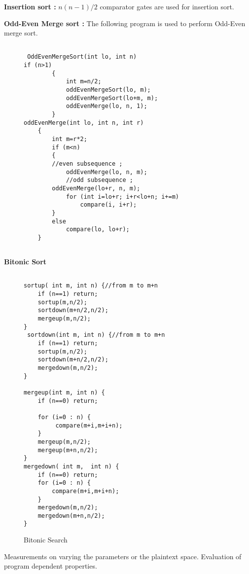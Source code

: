 \documentclass{acm_proc_article-sp}
\begin{document}
\textbf{Insertion sort :} $n(n-1)/2$ comparator gates are used for insertion sort.

\textbf{Odd-Even Merge sort :} The following program is used to perform Odd-Even merge sort.

\lstset{                                    %
  language=C,
  frame=lines,
  captionpos=b
 }


\renewcommand{\lstlistingname}{Code}


\begin{figure}
\begin{lstlisting}[caption=Odd-Even Merge Sort]

 OddEvenMergeSort(int lo, int n)
if (n>1)
        {
            int m=n/2;
            oddEvenMergeSort(lo, m);
            oddEvenMergeSort(lo+m, m);
            oddEvenMerge(lo, n, 1);
        }
oddEvenMerge(int lo, int n, int r)
    {
        int m=r*2;
        if (m<n)
        {
	    //even subsequence ;		
            oddEvenMerge(lo, n, m); 
            //odd subsequence ;
	    oddEvenMerge(lo+r, n, m);    
            for (int i=lo+r; i+r<lo+n; i+=m)
                compare(i, i+r);
        }
        else
            compare(lo, lo+r);
    }


\end{lstlisting} 

\end{figure}


\textbf{Bitonic Sort}
\begin{figure}
\begin{lstlisting}[caption=Bitonic Sort]

sortup( int m, int n) {//from m to m+n
    if (n==1) return;
    sortup(m,n/2);
    sortdown(m+n/2,n/2);
    mergeup(m,n/2);
}
 sortdown(int m, int n) {//from m to m+n
    if (n==1) return;
    sortup(m,n/2);
    sortdown(m+n/2,n/2);
    mergedown(m,n/2);
}

mergeup(int m, int n) {
    if (n==0) return;
    
    for (i=0 : n) {
         compare(m+i,m+i+n);
    }
    mergeup(m,n/2);
    mergeup(m+n,n/2);
}
mergedown( int m,  int n) {
    if (n==0) return;
    for (i=0 : n) {
        compare(m+i,m+i+n);
    }
    mergedown(m,n/2);
    mergedown(m+n,n/2);
}
\end{lstlisting}
\caption{Bitonic Search}
\end{figure}
Measurements on varying the parameters or the plaintext space. Evaluation of program dependent properties. 
\end{document}
